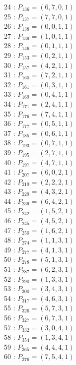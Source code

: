\documentclass{article}
\begin{document}
{\begin{multicols}{3}
24 : $P_{136}=( 6, 7, 0, 1 )$\\
25 : $P_{137}=( 7, 7, 0, 1 )$\\
26 : $P_{138}=( 0, 0, 1, 1 )$\\
27 : $P_{139}=( 1, 0, 1, 1 )$\\
28 : $P_{146}=( 0, 1, 1, 1 )$\\
29 : $P_{153}=( 0, 2, 1, 1 )$\\
30 : $P_{157}=( 4, 2, 1, 1 )$\\
31 : $P_{160}=( 7, 2, 1, 1 )$\\
32 : $P_{161}=( 0, 3, 1, 1 )$\\
33 : $P_{169}=( 0, 4, 1, 1 )$\\
34 : $P_{171}=( 2, 4, 1, 1 )$\\
35 : $P_{176}=( 7, 4, 1, 1 )$\\
36 : $P_{177}=( 0, 5, 1, 1 )$\\
37 : $P_{185}=( 0, 6, 1, 1 )$\\
38 : $P_{193}=( 0, 7, 1, 1 )$\\
39 : $P_{195}=( 2, 7, 1, 1 )$\\
40 : $P_{197}=( 4, 7, 1, 1 )$\\
41 : $P_{207}=( 6, 0, 2, 1 )$\\
42 : $P_{219}=( 2, 2, 2, 1 )$\\
43 : $P_{229}=( 4, 3, 2, 1 )$\\
44 : $P_{239}=( 6, 4, 2, 1 )$\\
45 : $P_{242}=( 1, 5, 2, 1 )$\\
46 : $P_{245}=( 4, 5, 2, 1 )$\\
47 : $P_{250}=( 1, 6, 2, 1 )$\\
48 : $P_{274}=( 1, 1, 3, 1 )$\\
49 : $P_{277}=( 4, 1, 3, 1 )$\\
50 : $P_{278}=( 5, 1, 3, 1 )$\\
51 : $P_{287}=( 6, 2, 3, 1 )$\\
52 : $P_{290}=( 1, 3, 3, 1 )$\\
53 : $P_{300}=( 3, 4, 3, 1 )$\\
54 : $P_{317}=( 4, 6, 3, 1 )$\\
55 : $P_{326}=( 5, 7, 3, 1 )$\\
56 : $P_{327}=( 6, 7, 3, 1 )$\\
57 : $P_{332}=( 3, 0, 4, 1 )$\\
58 : $P_{354}=( 1, 3, 4, 1 )$\\
59 : $P_{365}=( 4, 4, 4, 1 )$\\
60 : $P_{376}=( 7, 5, 4, 1 )$\\

\end{multicols}}
\end{document}
